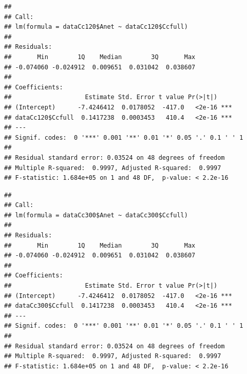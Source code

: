 \documentclass[
]{krantz}
\makeatletter
\newenvironment{Shaded}{\begin{snugshade}}{\end{snugshade}}
\newcommand{\CommentTok}[1]{\textcolor[rgb]{0.56,0.35,0.01}{\textit{#1}}}
\newcommand{\DecValTok}[1]{\textcolor[rgb]{0.00,0.00,0.81}{#1}}
\newcommand{\FunctionTok}[1]{\textcolor[rgb]{0.00,0.00,0.00}{#1}}
\newcommand{\NormalTok}[1]{#1}
\newcommand{\OtherTok}[1]{\textcolor[rgb]{0.56,0.35,0.01}{#1}}
\newcommand{\SpecialCharTok}[1]{\textcolor[rgb]{0.00,0.00,0.00}{#1}}
\newenvironment{kframe}{%
\medskip{}
\setlength{\fboxsep}{.8em}
 \def\at@end@of@kframe{}%
 \ifinner\ifhmode%
  \def\at@end@of@kframe{\end{minipage}}%
  \begin{minipage}{\columnwidth}%
 \fi\fi%
 \def\FrameCommand##1{\hskip\@totalleftmargin \hskip-\fboxsep
 \colorbox{shadecolor}{##1}\hskip-\fboxsep
     \hskip-\linewidth \hskip-\@totalleftmargin \hskip\columnwidth}%
 \MakeFramed {\advance\hsize-\width
   \@totalleftmargin\z@ \linewidth\hsize
   \@setminipage}}%
 {\par\unskip\endMakeFramed%
 \at@end@of@kframe}
\renewenvironment{Shaded}{\begin{kframe}}{\end{kframe}}
\makeatother
\begin{document}
\begin{verbatim}
## 
## Call:
## lm(formula = dataCc120$Anet ~ dataCc120$Ccfull)
## 
## Residuals:
##       Min        1Q    Median        3Q       Max 
## -0.074060 -0.024912  0.009651  0.031042  0.038607 
## 
## Coefficients:
##                    Estimate Std. Error t value Pr(>|t|)    
## (Intercept)      -7.4246412  0.0178052  -417.0   <2e-16 ***
## dataCc120$Ccfull  0.1417238  0.0003453   410.4   <2e-16 ***
## ---
## Signif. codes:  0 '***' 0.001 '**' 0.01 '*' 0.05 '.' 0.1 ' ' 1
## 
## Residual standard error: 0.03524 on 48 degrees of freedom
## Multiple R-squared:  0.9997, Adjusted R-squared:  0.9997 
## F-statistic: 1.684e+05 on 1 and 48 DF,  p-value: < 2.2e-16
\end{verbatim}

\begin{Shaded}
\end{Shaded}

\begin{verbatim}
## 
## Call:
## lm(formula = dataCc300$Anet ~ dataCc300$Ccfull)
## 
## Residuals:
##       Min        1Q    Median        3Q       Max 
## -0.074060 -0.024912  0.009651  0.031042  0.038607 
## 
## Coefficients:
##                    Estimate Std. Error t value Pr(>|t|)    
## (Intercept)      -7.4246412  0.0178052  -417.0   <2e-16 ***
## dataCc300$Ccfull  0.1417238  0.0003453   410.4   <2e-16 ***
## ---
## Signif. codes:  0 '***' 0.001 '**' 0.01 '*' 0.05 '.' 0.1 ' ' 1
## 
## Residual standard error: 0.03524 on 48 degrees of freedom
## Multiple R-squared:  0.9997, Adjusted R-squared:  0.9997 
## F-statistic: 1.684e+05 on 1 and 48 DF,  p-value: < 2.2e-16
\end{verbatim}

\begin{Shaded}
\end{Shaded}
\end{document}
